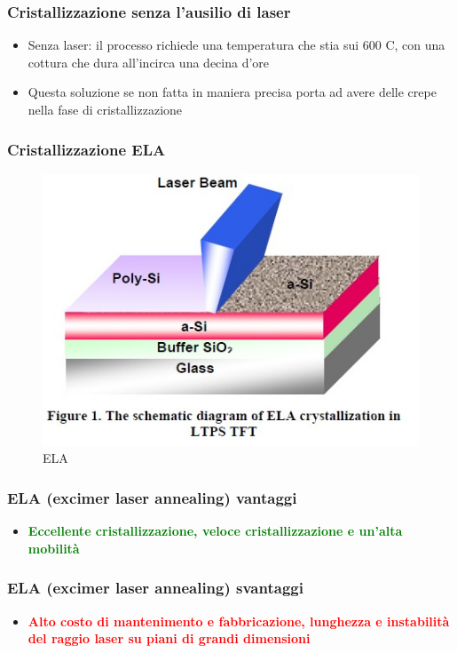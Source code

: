 \documentclass[12pt]{beamer}
\begin{document}
	\begin{frame}
		\frametitle{Cristallizzazione senza l'ausilio di laser}
		\begin{itemize}
			\item Senza laser: il processo richiede una temperatura che stia sui 600 \degree C, con una cottura che dura all'incirca una decina d'ore
			\pause
			\item Questa soluzione se non fatta in maniera precisa porta ad avere delle crepe nella fase di cristallizzazione
		\end{itemize}
	\end{frame}
	\begin{frame}
		\frametitle{Cristallizzazione ELA}
			\begin{figure}
				\centering
				\includegraphics[width=1\linewidth]{"FISICA/ELA cristallizzazione"}
				\caption{ELA}
				\label{fig:ela-cristallizzazione}
			\end{figure}
	\end{frame}
	\begin{frame}
		\frametitle{ELA (excimer laser annealing) vantaggi}
		\begin{itemize}
			\item \textbf{\textcolor{green}{Eccellente cristallizzazione, veloce cristallizzazione e un'alta mobilità}}
		\end{itemize}
	\end{frame}
	\begin{frame}
		\frametitle{ELA (excimer laser annealing) svantaggi}
		\begin{itemize}
			\item \textbf{\textcolor{red}{Alto costo di mantenimento e fabbricazione, lunghezza e instabilità del raggio laser su piani di grandi dimensioni}}
		\end{itemize}
	\end{frame}
\end{document}
